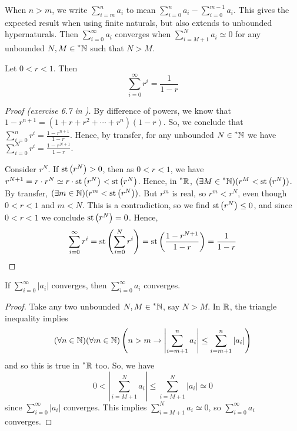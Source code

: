 When $n > m$, we write $\sum_{i=m}^n a_i$ to mean $\sum_{i=0}^n a_i - \sum_{i=0}^{m-1} a_i$. This gives the expected result when using finite naturals, but also extends to unbounded hypernaturals. Then $\sum_{i=0}^\infty a_i$ converges when $\sum_{i=M+1}^N a_i \simeq 0$ for any unbounded $N, M \in \prescript{*}{}{\mathbb{N}}$ such that $N > M$.

\begin{thm}\label{GeometricSeries}
    Let $0 < r < 1$. Then 
    \[ \sum_{i = 0}^\infty r^i = \frac{1}{1-r} \]
\end{thm}

\begin{proof}[Proof (exercise 6.7 in \cite{goldblatt1998})]
    By difference of powers, we know that $1 - r^{n+1} = (1 + r + r^2 + \cdots + r^n)(1-r)$. So, we conclude that $\sum_{i=0}^n r^i = \frac{1-r^{n+1}}{1-r}$. Hence, by transfer, for any unbounded $N \in \prescript{*}{}{\mathbb{N}}$ we have $\sum_{i=0}^N r^i = \frac{1-r^{N+1}}{1-r}$. 

    Consider $r^{N}$. If $\operatorname{st}\left(r^N\right) > 0$, then as $0 < r < 1$, we have $r^{N+1} = r \cdot r^N \simeq r\cdot \operatorname{st}\left(r^N\right) < \operatorname{st}\left(r^N\right)$. Hence, in $\prescript{*}{}{\mathbb{R}}$, $(\exists M \in \prescript{*}{}{\mathbb{N}})(r^M < \operatorname{st}\left(r^N\right))$. By transfer, $(\exists m \in \mathbb{N})(r^m < \operatorname{st}\left(r^N\right))$. But $r^m$ is real, so $r^m < r^N$, even though $0 < r < 1$ and $m < N$. This is a contradiction, so we find $\operatorname{st}\left(r^N\right) \leq 0$, and since $0 < r < 1$ we conclude $\operatorname{st}\left(r^N\right) = 0$. Hence, 
    \[\sum_{i=0}^\infty r^i = \operatorname{st}\left(\sum_{i=0}^N r^i\right) = \operatorname{st}\left(\frac{1-r^{N+1}}{1-r}\right) = \frac{1}{1-r} \]
\end{proof}

\begin{thm}\label{AbsoluteConvergenceImpliesConvergence}
    If $\sum_{i = 0}^\infty |a_i|$ converges, then $\sum_{i = 0}^\infty a_i$ converges.
\end{thm}

\begin{proof}
    Take any two unbounded $N, M \in \prescript{*}{}{\mathbb{N}}$, say $N > M$. In $\mathbb{R}$, the triangle inequality implies \[(\forall n \in \mathbb{N})(\forall m \in \mathbb{N})\left(n > m \to \left|\sum_{i = m + 1}^n a_i \right| \leq \sum_{i = m + 1}^n  |a_i|\right)\]
    and so this is true in $\prescript{*}{}{\mathbb{R}}$ too. So, we have 
    \[0 < \left|\sum_{i=M+1}^N a_i\right| \leq \sum_{i=M+1}^N |a_i| \simeq 0\]
    since $\sum_{i=0}^\infty |a_i|$ converges. This implies $\sum_{i=M+1}^N a_i \simeq 0$, so $\sum_{i=0}^\infty a_i$ converges.
\end{proof}

